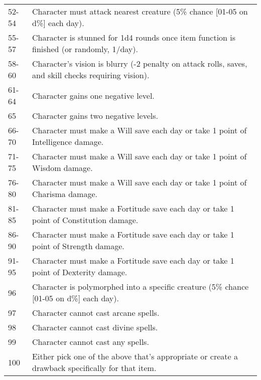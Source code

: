 \begin{tabular}{ll}
52-54        & Character must attack nearest creature (5\% chance {[}01-05 on d\%{]} each day).                        \\
55-57        & Character is stunned for 1d4 rounds once item function is finished (or randomly, 1/day).                \\
58-60        & Character's vision is blurry (-2 penalty on attack rolls, saves, and skill checks requiring vision).    \\
61-64        & Character gains one negative level.                                                                     \\
65           & Character gains two negative levels.                                                                    \\
66-70        & Character must make a Will save each day or take 1 point of Intelligence damage.                        \\
71-75        & Character must make a Will save each day or take 1 point of Wisdom damage.                              \\
76-80        & Character must make a Will save each day or take 1 point of Charisma damage.                            \\
81-85        & Character must make a Fortitude save each day or take 1 point of Constitution damage.                   \\
86-90        & Character must make a Fortitude save each day or take 1 point of Strength damage.                       \\
91-95        & Character must make a Fortitude save each day or take 1 point of Dexterity damage.                      \\
96           & Character is polymorphed into a specific creature (5\% chance {[}01-05 on d\%{]} each day).             \\
97           & Character cannot cast arcane spells.                                                                    \\
98           & Character cannot cast divine spells.                                                                    \\
99           & Character cannot cast any spells.                                                                       \\
100          & Either pick one of the above that's appropriate or create a drawback specifically for that item.       
\end{tabular}